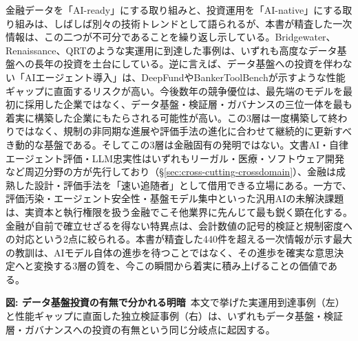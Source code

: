 金融データを「AI-ready」にする取り組みと、投資運用を「AI-native」にする取り組みは、しばしば別々の技術トレンドとして語られるが、本書が精査した一次情報は、この二つが不可分であることを繰り返し示している。Bridgewater\cite{bridgewater_aialabs_nd}、Renaissance\cite{institutionalinvestor2025renaissance}、QRT\cite{bloomberg_qube2026}のような実運用に到達した事例は、いずれも高度なデータ基盤への長年の投資を土台にしている。逆に言えば、データ基盤への投資を伴わない「AIエージェント導入」は、DeepFund\cite{deepfund2025}やBankerToolBench\cite{bankertoolbench2026}が示すような性能ギャップに直面するリスクが高い。今後数年の競争優位は、最先端のモデルを最初に採用した企業ではなく、データ基盤・検証層・ガバナンスの三位一体を最も着実に構築した企業にもたらされる可能性が高い。この3層は一度構築して終わりではなく、規制の非同期な進展や評価手法の進化に合わせて継続的に更新すべき動的な基盤である。そしてこの3層は金融固有の発明ではない。文書AI・自律エージェント評価・LLM忠実性はいずれもリーガル・医療・ソフトウェア開発など周辺分野の方が先行しており（\S\ref{sec:cross-cutting-crossdomain}）、金融は成熟した設計・評価手法を「速い追随者」として借用できる立場にある。一方で、評価汚染・エージェント安全性・基盤モデル集中といった汎用AIの未解決課題は、実資本と執行権限を扱う金融でこそ他業界に先んじて最も鋭く顕在化する。金融が自前で確立せざるを得ない特異点は、会計数値の記号的検証と規制密度への対応という2点に絞られる。本書が精査した440件を超える一次情報が示す最大の教訓は、AIモデル自体の進歩を待つことではなく、その進歩を確実な意思決定へと変換する3層の質を、今この瞬間から着実に積み上げることの価値である。

\begin{center}
\end{center}
{\small\color{brandgray}\textbf{図: データ基盤投資の有無で分かれる明暗}\ 本文で挙げた実運用到達事例（左）と性能ギャップに直面した独立検証事例（右）は、いずれもデータ基盤・検証層・ガバナンスへの投資の有無という同じ分岐点に起因する。}
